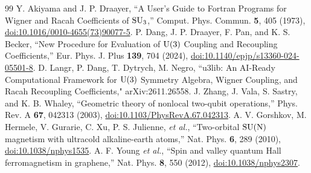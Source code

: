 \documentclass[aps,onecolumn,10pt,superscriptaddress,floatfix,nofootinbib]{revtex4}
\begin{document}
\begin{thebibliography}{99}
 Y. Akiyama and J. P. Draayer, ``A User's Guide to Fortran Programs for Wigner and Racah Coefficients of $\rm SU_3$,'' Comput. Phys. Commun. \textbf{5}, 405 (1973), \href{https://doi.org/10.1016/0010-4655(73)90077-5}{doi:10.1016/0010-4655(73)90077-5}.
 P. Dang, J. P. Draayer, F. Pan, and K. S. Becker, ``New Procedure for Evaluation of $\rm U(3)$ Coupling and Recoupling Coefficients,'' Eur. Phys. J. Plus \textbf{139}, 704 (2024), \href{https://doi.org/10.1140/epjp/s13360-024-05501-8}{doi:10.1140/epjp/s13360-024-05501-8}.
 D. Langr, P. Dang, T. Dytrych, M. Negro, ``u3lib: An AI-Ready Computational Framework for $\rm U(3)$ Symmetry Algebra, Wigner Coupling, and Racah Recoupling Coefficients," arXiv:2611.26558.
 J. Zhang, J. Vala, S. Sastry, and K. B. Whaley, ``Geometric theory of nonlocal two-qubit operations,'' Phys. Rev. A \textbf{67}, 042313 (2003), \href{https://doi.org/10.1103/PhysRevA.67.042313}{doi:10.1103/PhysRevA.67.042313}.
 A. V. Gorshkov, M. Hermele, V. Gurarie, C. Xu, P. S. Julienne, \textit{et al.}, ``Two-orbital $\rm SU(N)$ magnetism with ultracold alkaline-earth atoms,'' Nat. Phys. \textbf{6}, 289 (2010), \href{https://doi.org/10.1038/nphys1535}{doi:10.1038/nphys1535}.
 A. F. Young \textit{et al.}, ``Spin and valley quantum Hall ferromagnetism in graphene,'' Nat. Phys. \textbf{8}, 550 (2012), \href{https://doi.org/10.1038/nphys2307}{doi:10.1038/nphys2307}.

\end{thebibliography}
\end{document}
